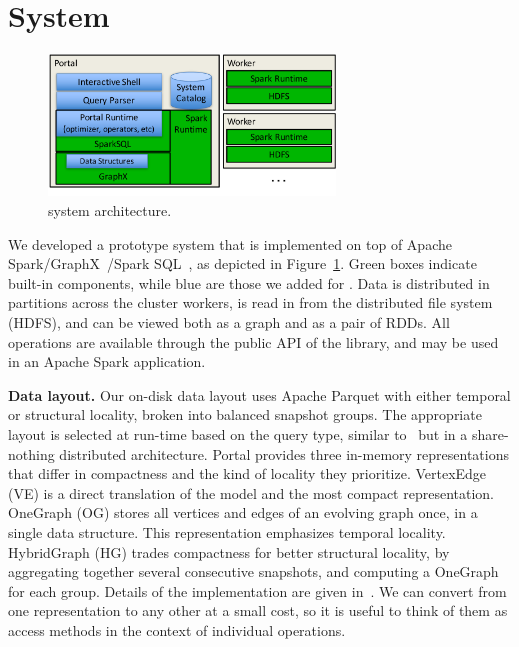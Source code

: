 \section{System}
\label{sec:sys}

\begin{figure}[t]
\centering
\includegraphics[width=3in]{figs/architecture.pdf}
\vspace{-0.5cm}
\caption{\sys system architecture.}
\vspace{-0.5cm}
\label{fig:arch}
\end{figure}

We developed a prototype system \sys that is implemented on top of
Apache Spark/GraphX~\cite{DBLP:conf/osdi/GonzalezXDCFS14}/Spark
SQL~\cite{Armbrust2015}, as depicted in Figure~\ref{fig:arch}.  Green
boxes indicate built-in components, while blue are those we added for
\sys.  Data is distributed in partitions across the cluster workers,
is read in from the distributed file system (HDFS), and can be viewed
both as a graph and as a pair of RDDs.  All \tg operations are
available through the public API of the \sys library, and may be used
in an Apache Spark application.

{\bf Data layout.}  Our on-disk data layout uses Apache Parquet with
either temporal or structural locality, broken into balanced snapshot
groups.  The appropriate layout is selected at run-time based on the
query type, similar to~\cite{Miao2015} but in a share-nothing
distributed architecture.  Portal provides three in-memory \tg
representations that differ in compactness and the kind of locality
they prioritize. VertexEdge (VE) is a direct translation of the model
and the most compact representation.  OneGraph (OG) stores all
vertices and edges of an evolving graph once, in a single data
structure.  This representation emphasizes temporal locality.
HybridGraph (HG) trades compactness for better structural locality, by
aggregating together several consecutive snapshots, and computing a
OneGraph for each group.  Details of the implementation are given
in~\cite{PortalarXiv2016}.  We can convert from one representation to
any other at a small cost,
so it is useful to think of them as access methods in the context of
individual operations.


